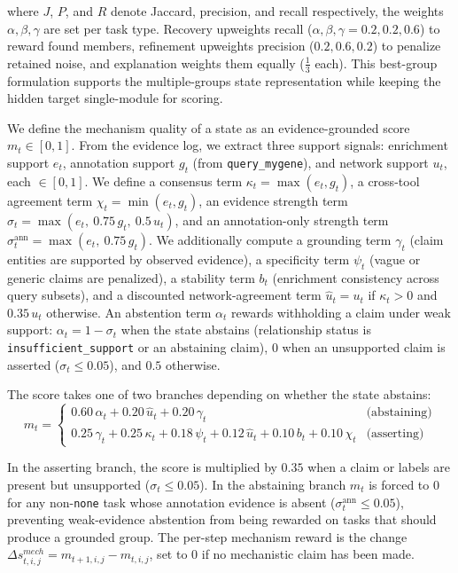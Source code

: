 \documentclass[thesis,letterpaper,12pt]{utthesis}
\begin{document}
where $J$, $P$, and $R$ denote Jaccard, precision, and recall respectively, the weights $\alpha, \beta, \gamma$ are set per task type. Recovery upweights recall ($\alpha,\beta,\gamma = 0.2, 0.2, 0.6$) to reward found members, refinement upweights precision ($0.2, 0.6, 0.2$) to penalize retained noise, and explanation weights them equally ($\tfrac{1}{3}$ each). This best-group formulation supports the multiple-groups state representation while keeping the hidden target single-module for scoring.

We define the mechanism quality of a state as an evidence-grounded score $m_t \in [0,1]$. From the evidence log, we extract three support signals: enrichment support $e_t$, annotation support $g_t$ (from \texttt{query\_mygene}), and network support $u_t$, each $\in [0,1]$. We define a consensus term $\kappa_t = \max(e_t, g_t)$, a cross-tool agreement term $\chi_t = \min(e_t, g_t)$, an evidence strength term $\sigma_t = \max(e_t,\ 0.75\,g_t,\ 0.5\,u_t)$, and an annotation-only strength term $\sigma^{\text{ann}}_t = \max(e_t,\ 0.75\,g_t)$. We additionally compute a grounding term $\gamma_t$ (claim entities are supported by observed evidence), a specificity term $\psi_t$ (vague or generic claims are penalized), a stability term $b_t$ (enrichment consistency across query subsets), and a discounted network-agreement term $\hat{u}_t = u_t$ if $\kappa_t > 0$ and $0.35\,u_t$ otherwise. An abstention term $\alpha_t$ rewards withholding a claim under weak support: $\alpha_t = 1 - \sigma_t$ when the state abstains (relationship status is \texttt{insufficient\_support} or an abstaining claim), $0$ when an unsupported claim is asserted ($\sigma_t \le 0.05$), and $0.5$ otherwise.

The score takes one of two branches depending on whether the state abstains:
\[
    m_t = \begin{cases}
        0.60\,\alpha_t + 0.20\,\hat{u}_t + 0.20\,\gamma_t & \text{(abstaining)} \\[4pt]
        0.25\,\gamma_t + 0.25\,\kappa_t + 0.18\,\psi_t + 0.12\,\hat{u}_t + 0.10\,b_t + 0.10\,\chi_t & \text{(asserting)}
    \end{cases}
\]

In the asserting branch, the score is multiplied by $0.35$ when a claim or labels are present but unsupported ($\sigma_t \le 0.05$). In the abstaining branch $m_t$ is forced to $0$ for any non-\texttt{none} task whose annotation evidence is absent ($\sigma^{\text{ann}}_t \le 0.05$), preventing weak-evidence abstention from being rewarded on tasks that should produce a grounded group. The per-step mechanism reward is the change $\Delta s^{mech}_{t,i,j} = m_{t+1,i,j} - m_{t,i,j}$, set to $0$ if no mechanistic claim has been made.
\end{document}
